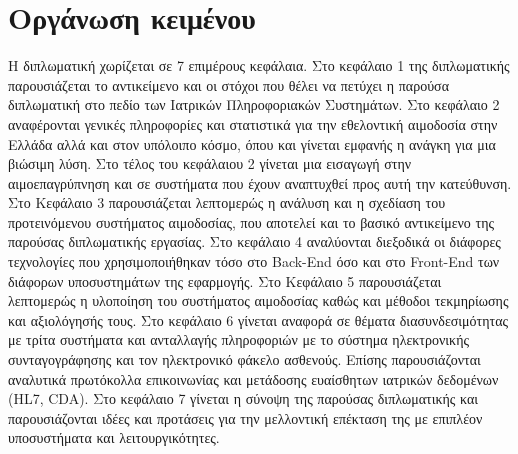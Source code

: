 \section{Οργάνωση κειμένου}
H διπλωματική χωρίζεται σε 7 επιμέρους κεφάλαια. Στο κεφάλαιο 1 της διπλωματικής παρουσιάζεται το αντικείμενο και οι στόχοι που θέλει να πετύχει η παρούσα διπλωματική στο πεδίο των Ιατρικών Πληροφοριακών Συστημάτων. Στο κεφάλαιο 2 αναφέρονται γενικές πληροφορίες και στατιστικά για την εθελοντική αιμοδοσία στην Ελλάδα αλλά και στον υπόλοιπο κόσμο, όπου και γίνεται εμφανής η ανάγκη για μια βιώσιμη λύση. Στο τέλος του κεφάλαιου 2 γίνεται μια εισαγωγή στην αιμοεπαγρύπνηση και σε συστήματα που έχουν αναπτυχθεί προς αυτή την κατεύθυνση. Στο Κεφάλαιο 3 παρουσιάζεται λεπτομερώς η ανάλυση και η σχεδίαση του προτεινόμενου συστήματος αιμοδοσίας, που αποτελεί και το βασικό αντικείμενο της παρούσας διπλωματικής εργασίας. Στο κεφάλαιο 4 αναλύονται διεξοδικά οι διάφορες τεχνολογίες που χρησιμοποιήθηκαν τόσο στο Back-End όσο και στο Front-End των διάφορων υποσυστημάτων της εφαρμογής. Στο Κεφάλαιο 5 παρουσιάζεται λεπτομερώς η υλοποίηση του συστήματος αιμοδοσίας καθώς και μέθοδοι τεκμηρίωσης και αξιολόγησής τους. Στο κεφάλαιο 6 γίνεται αναφορά σε θέματα διασυνδεσιμότητας με τρίτα συστήματα και ανταλλαγής πληροφοριών με το σύστημα ηλεκτρονικής συνταγογράφησης και τον ηλεκτρονικό φάκελο ασθενούς. Επίσης παρουσιάζονται αναλυτικά πρωτόκολλα επικοινωνίας και μετάδοσης ευαίσθητων ιατρικών δεδομένων (HL7, CDA). Στο κεφάλαιο 7 γίνεται η σύνοψη της παρούσας διπλωματικής και παρουσιάζονται ιδέες και προτάσεις για την μελλοντική επέκταση της με επιπλέον υποσυστήματα και λειτουργικότητες.